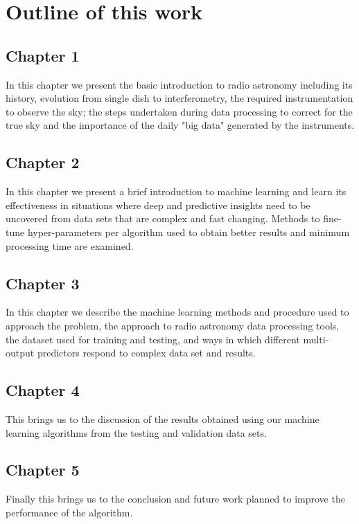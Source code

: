 \chapter*{Outline of this work}

\section*{Chapter 1}
In this chapter we present the basic introduction to radio astronomy including its history, evolution from single dish to interferometry, the required instrumentation to observe the sky; the steps undertaken during data processing to correct for the true sky and the importance of the daily "big data" generated by the instruments.    
\section*{Chapter 2}
In this chapter we present a brief introduction to machine learning and learn its effectiveness in situations where deep and predictive insights need to be uncovered from data sets that are complex and fast changing. Methods to fine-tune hyper-parameters per algorithm used to obtain better results and minimum processing time are examined.  
\section*{Chapter 3}
In this chapter we describe the machine learning methods and procedure used to approach the problem, the approach to radio astronomy data processing tools, the dataset used for training and testing, and ways in which different multi-output predictors respond to complex data set and results.
\section*{Chapter 4}
This brings us to the discussion of the results obtained using our machine learning algorithms from the testing and validation data sets. 
\section*{Chapter 5}
Finally this brings us to the conclusion and future work planned to improve the performance of the algorithm.

